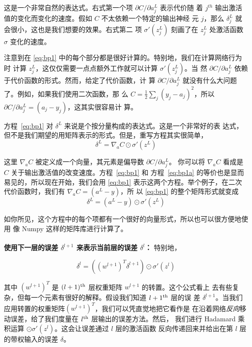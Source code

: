这是一个非常自然的表达式。右式第一个项 $\partial C/\partial a_j^L$ 表示代价随
着 $j^{th}$ 输出激活值的变化而变化的速度。假如 $C$ 不太依赖一个特定的输出神经
元 $j$，那么 $\delta_j^L$ 就会很小，这也是我们想要的效果。右式第二
项 $\sigma'(z_j^L)$ 刻画了在 $z_j^L$ 处激活函数 $\sigma$ 变化的速度。

注意到在 \eqref{eq:bp1} 中的每个部分都是很好计算的。特别地，我们在计算网络行为时
计算 $z_j^L$，这仅仅需要一点点额外工作就可以计算 $\sigma'(z_j^L)$。当
然 $\partial C/\partial a_j^L$ 依赖于代价函数的形式。然而，给定了代价函数，计
算 $\partial C/\partial a_j^L$ 就没有什么大问题了。例如，如果我们使用二次函数，那
么 $C = \frac{1}{2}
\sum_j(y_j-a_j)^2$，所以$\partial C/\partial a_j^L = (a_j - y_j)$，这其实很容易计
算。

方程~\eqref{eq:bp1} 对 $\delta^L$ 来说是个按分量构成的表达式。这是一个非常好的表
达式，但不是我们期望的用矩阵表示的形式。但是，重写方程其实很简单，
\begin{equation} 
  \delta^L = \nabla_a C \odot \sigma'(z^L)
  \label{eq:bp1a}\tag{BP1a}
\end{equation}

这里 $\nabla_a C$ 被定义成一个向量，其元素是偏导数 $\partial C/\partial a_j^L$。
你可以将 $\nabla_a C$ 看成是 $C$ 关于输出激活值的改变速度。方程~\eqref{eq:bp1} 和
方程~\eqref{eq:bp1a} 的等价也是显而易见的，所以现在开始，我们会用 \eqref{eq:bp1}
表示这两个方程。举个例子，在二次代价函数时，我们有 $\nabla_a C = (a^L - y)$，所
以 \eqref{eq:bp1} 的整个矩阵形式就变成
\begin{equation} 
  \delta^L = (a^L-y) \odot \sigma'(z^L)
  \label{eq:30}\tag{30}
\end{equation}

如你所见，这个方程中的每个项都有一个很好的向量形式，所以也可以很方便地使用
像 Numpy 这样的矩阵库进行计算了。
\\
\\
\textbf{使用下一层的误差 $\delta^{l+1}$ 来表示当前层的误差 $\delta^l$：} 特别地，

\begin{equation}
  \delta^l = ((w^{l+1})^T \delta^{l+1}) \odot \sigma'(z^l)
  \label{eq:bp2}\tag{BP2}
\end{equation}

其中 $(w^{l+1})^T$ 是 $(l+1)^{\rm th}$ 层权重矩阵 $w^{l+1}$ 的转置。这个公式看上
去有些复杂，但每一个元素有很好的解释。假设我们知道 $l+1^{\rm th}$ 层的误
差
$\delta^{l+1}$。当我们应用转置的权重矩阵$(w^{l+1})^T$，我们可以凭直觉地把它看作是
在沿着网络\emph{反向}移动误差，给了我们度量在 $l^{\rm th}$ 层输出的误差方法。然后，
我们进行 Hadamard 乘积运算 $\odot \sigma'(z^l)$。这会让误差通过 $l$ 层的激活函数
反向传递回来并给出在第 $l$ 层的带权输入的误差 $\delta$。

